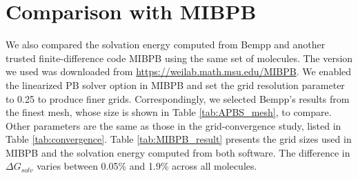 {\section{Comparison with MIBPB}\label{sec:comp_mibpb}
We also compared the solvation energy computed from Bempp and another trusted finite-difference code MIBPB using the same set of molecules.
The version we used was downloaded from \href{https://weilab.math.msu.edu/MIBPB}{https://weilab.math.msu.edu/MIBPB}.
We enabled the linearized PB solver option in MIBPB and set the grid resolution parameter to 0.25 to produce finer grids.
Correspondingly, we selected Bempp's results from the finest mesh, whose size is shown in Table \ref{tab:APBS_mesh}, to compare.
Other parameters are the same as those in the grid-convergence study, listed in Table \ref{tab:convergence}.
Table \ref{tab:MIBPB_result} presents the grid sizes used in MIBPB and the solvation energy computed from both software.
The difference in $\Delta G_{solv}$ varies between 0.05\% and 1.9\% across all molecules.

\begin{table}[]
    \centering
    \caption{MIBPB and Bempp results of the solvation energy $\Delta G_{solv}$ of different molecules, in units of kcal/mol.}
    \label{tab:MIBPB_result}
\end{table}


}
